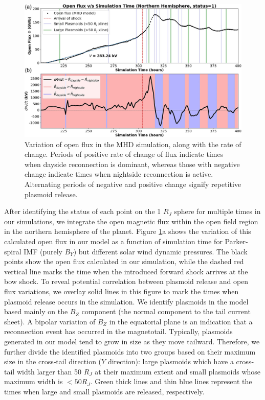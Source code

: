 \begin{figure}
    \centering
    \includegraphics[width=\textwidth]{images4/open-flux-time.jpg}
    \caption{Variation of open flux in the MHD simulation, along with the rate of change. Periods of positive rate of change of flux indicate times when dayside reconnection is dominant, whereas those with negative change indicate times when nightside reconnection is active. Alternating periods of negative and positive change signify repetitive plasmoid release.}
    \label{fig:open-flux-time}
\end{figure}

After identifying the status of each point on the 1 $R_J$ sphere for multiple times in our simulations, we integrate the open magnetic flux within the open field region in the northern hemisphere of the planet. Figure \ref{fig:open-flux-time}a shows the variation of this calculated open flux in our model as a function of simulation time for Parker‐spiral IMF (purely $B_Y$) but different solar wind dynamic pressures. The black points show the open flux calculated in our simulation, while the dashed red vertical line marks the time when the introduced forward shock arrives at the bow shock. To reveal potential correlation between plasmoid release and open flux variations, we overlay solid lines in this figure to mark the times when plasmoid release occurs in the simulation. We identify plasmoids in the model based mainly on the $B_Z$ component (the normal component to the tail current sheet). A bipolar variation of $B_Z$ in the equatorial plane is an indication that a reconnection event has occurred in the magnetotail. Typically, plasmoids generated in our model tend to grow in size as they move tailward. Therefore, we further divide the identified plasmoids into two groups based on their maximum size in the cross‐tail direction ($Y$ direction): large plasmoids which have a cross‐tail width larger than 50 $R_J$ at their maximum extent and small plasmoids whose maximum width is $<50 R_J$. Green thick lines and thin blue lines represent the times when large and small plasmoids are released, respectively.

